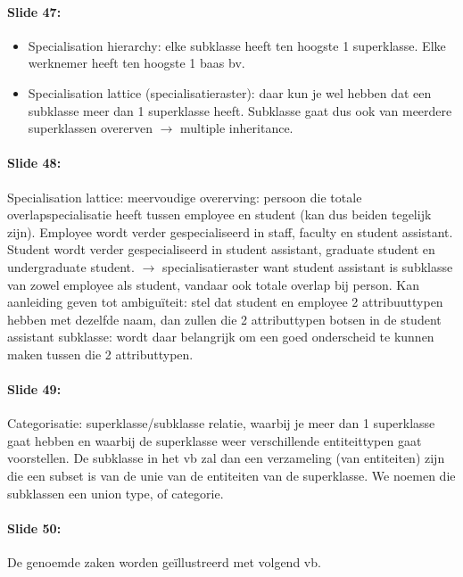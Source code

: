 \documentclass[10pt,a4paper]{report}
\begin{document}
\paragraph{Slide 47:}
\begin{itemize}
\item Specialisation hierarchy: elke subklasse heeft ten hoogste 1 superklasse. Elke werknemer heeft ten hoogste 1 baas bv.
\item Specialisation lattice (specialisatieraster): daar kun je wel hebben dat een subklasse meer dan 1 superklasse heeft. Subklasse gaat dus ook van meerdere superklassen overerven $\rightarrow$ multiple inheritance.
\end{itemize}

\paragraph{Slide 48:}Specialisation lattice: meervoudige overerving: persoon die totale overlapspecialisatie heeft tussen employee en student (kan dus beiden tegelijk zijn). Employee wordt verder gespecialiseerd in staff, faculty en student assistant. Student wordt verder gespecialiseerd in student assistant, graduate student en undergraduate student. $\rightarrow$ specialisatieraster want student assistant is subklasse van zowel employee als student, vandaar ook totale overlap bij person. Kan aanleiding geven tot ambiguïteit: stel dat student en employee 2 attribuuttypen hebben met dezelfde naam, dan zullen die 2 attributtypen botsen in de student assistant subklasse: wordt daar belangrijk om een goed onderscheid te kunnen maken tussen die 2 attributtypen.

\paragraph{Slide 49:}Categorisatie: superklasse/subklasse relatie, waarbij je meer dan 1 superklasse gaat hebben en waarbij de superklasse weer verschillende entiteittypen gaat voorstellen. De subklasse in het vb zal dan een verzameling (van entiteiten) zijn die een subset is van de unie van de entiteiten van de superklasse. We noemen die subklassen een union type, of categorie.

\paragraph{Slide 50:}De genoemde zaken worden geïllustreerd met volgend vb.
\end{document}
